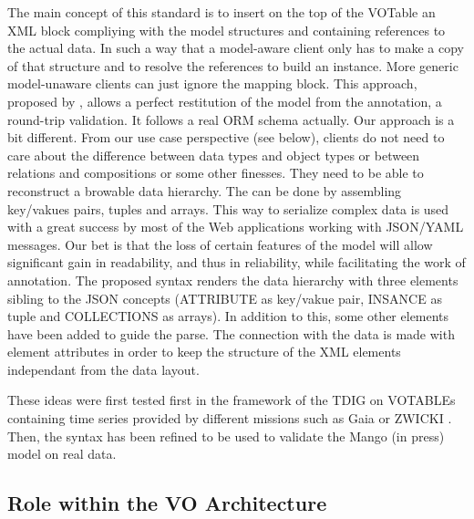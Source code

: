 \documentclass[11pt,a4paper]{ivoa}
\begin{document}
The main concept of this standard is to insert on the  top of the VOTable an XML block compliying with the model structures and containing references to the actual data.
In such a way that a model-aware client only has to make a copy of that structure and to resolve the references  to build an instance. More generic model-unaware clients can just ignore the mapping block. 
This approach, proposed by \cite{wd:wdmapping}, allows a perfect restitution of the model from the annotation, a round-trip validation. It follows a real ORM schema actually.
Our approach is a bit different. From our use case perspective (see below), clients do not need  to care about the difference between data types and object types or between relations and compositions or some other finesses. They need to be able to reconstruct a browable data hierarchy. The can be done by assembling key/vakues pairs, tuples and arrays. This way to serialize complex data is used with a great success by most of the Web applications working with JSON/YAML messages. 
Our bet is that the loss of certain features of the model will allow significant gain in readability, and thus in reliability, while facilitating the work of annotation. 
The proposed syntax renders the data hierarchy with three elements sibling to the JSON concepts (ATTRIBUTE as key/vakue pair, INSANCE as tuple and COLLECTIONS as arrays). In addition to this, some other elements have been added to guide the parse. 
The connection with the data is made with element attributes in order to keep the structure of the XML elements independant from the data layout.

These ideas were first tested first in the framework of the TDIG on VOTABLEs containing time series provided by different missions such as Gaia or ZWICKI \citep{talk:lmlite}. 
Then, the syntax has been refined to be used to validate the Mango (in press) model on real data.


\lstset{language=XML}

\subsection{Role within the VO Architecture}
\end{document}
